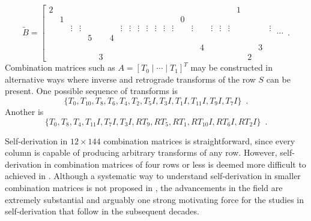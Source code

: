 \begin{example}
	\begin{equation}
    	\tilde{B} = \left[
    	\begin{array}{cccccccccccc|cccccccccccc|}
        	2 &&&&&&&&&&&&&&&&&&&& 1 &&& \\
        	& 1 &&&&&&&&&&&&& 0 &&&&&&&&& \\
        	&& \vdots & \vdots &&&& \vdots & \vdots & \vdots & \vdots & \vdots & \vdots & \vdots && \vdots && \vdots & \vdots & \vdots &&&& \vdots \\
        	&&&& 5 && \boxed{4} &&&&&&&&&&&&&&&&& \\
        	&&&&&&&&&&&&&&&& \boxed{4} &&&&&& 3 & \\
        	&&&&& 3 &&&&&&&&&&&&&&&& 2 &&
    	\end{array}
    	\; \cdots \right. \enspace.
    \end{equation}
    Combination matrices such as $A = [T_0 \; | \; \cdots \; | \; T_1]^T$ may be constructed in alternative ways where inverse and retrograde transforms of the row $S$ can be present. One possible sequence of transforms is
	\begin{equation}
		\{ T_0, T_{10}, T_{8}, T_{6}, T_{4}, T_{2}, T_{5}I, T_{3}I, T_{1}I, T_{11}I, T_{9}I, T_{7}I \} \enspace .
	\end{equation}
	Another is
	\begin{equation}
		\{ T_0, T_{8}, T_{4}, T_{11}I, T_{7}I, T_{3}I, RT_{9}, RT_{5}, RT_{1}, RT_{10}I, RT_{6}I, RT_{2}I \} \enspace .
	\end{equation}
\end{example}

Self-derivation in $12 \times 144$ combination matrices is straightforward, since every column is capable of producing arbitrary transforms of any row. However, self-derivation in combination matrices of four rows or less is deemed more difficult to achieved in \cite[108]{Westergaard1966}. Although a systematic way to understand self-derivation in smaller combination matrices is not proposed in \cite{Westergaard1966}, the advancements in the field are extremely substantial and arguably one strong motivating force for the studies in self-derivation that follow in the subsequent decades.

